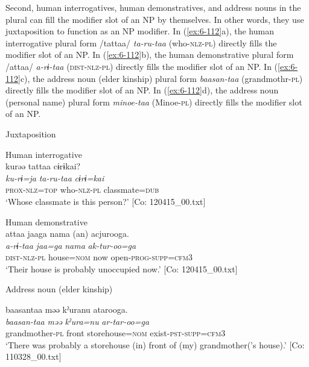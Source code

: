   Second, human interrogatives, human demonstratives, and address nouns in the plural can fill the modifier slot of an NP by themselves. In other words, they use juxtaposition to function as an NP modifier. In (\ref{ex:6-112}a), the human interrogative plural form /tattaa/ \textit{ta-ru-taa} (who-\textsc{nlz}-\textsc{pl}) directly fills the modifier slot of an NP. In (\ref{ex:6-112}b), the human demonstrative plural form /attaa/ \textit{a-rɨ-taa} (\textsc{dist}-\textsc{nlz}-\textsc{pl}) directly fills the modifier slot of an NP. In (\ref{ex:6-112}c), the address noun (elder kinship) plural form \textit{baasan-taa} (grandmothr-\textsc{pl}) directly fills the modifier slot of an NP. In (\ref{ex:6-112}d), the address noun (personal name) plural form \textit{minoe-taa} (Minoe-\textsc{pl}) directly fills the modifier slot of an NP.

\ea\label{ex:6-112}
  Juxtaposition

 \ea Human interrogative\\
{\TM}
\glll  kurəə  tattaa  cɨrɨkai?\\
\textit{ku-rɨ=ja}  \textit{ta-ru-taa}  \textit{cɨrɨ=kai}\\
\textsc{prox}-\textsc{nlz}=\textsc{top}  who-\textsc{nlz}-\textsc{pl}  classmate=\textsc{dub}\\
\glt ‘Whose classmate is this person?’ [Co: 120415\_00.txt]
\z

\ex Human demonstrative\\
{\TM}
\glll  attaa  jaaga  nama  (an)  acjurooga.\\
\textit{a-rɨ-taa}  \textit{jaa=ga}  \textit{nama}    \textit{ak-tur-oo=ga}\\
\textsc{dist}-\textsc{nlz}-\textsc{pl}  house=\textsc{nom}  now    open-\textsc{prog}-\textsc{supp}=\textsc{cfm}3\\
\glt ‘Their house is probably unoccupied now.’ [Co: 120415\_00.txt]
\z

\ex Address noun (elder kinship)\\
\gll

{\US}
\gll baasantaa  məə  kˀuranu  atarooga.\\
      \textit{baasan-taa}  \textit{məə}  \textit{kˀura=nu}  \textit{ar-tar-oo=ga}\\
      grandmother-\textsc{pl}  front  storehouse=\textsc{nom}  exist-\textsc{pst}-\textsc{supp}=\textsc{cfm}3\\
\glt ‘There was probably a storehouse (in) front of (my) grandmother(’s house).’ [Co: 110328\_00.txt]
\z

